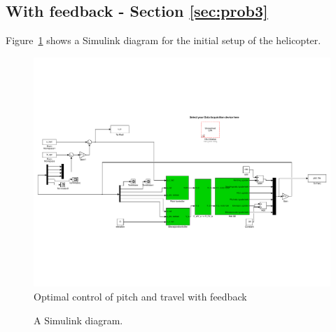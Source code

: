 \documentclass[11pt,a4paper,USenglish]{article} %
\begin{document}
\newpage
\subsection{With feedback - Section \ref{sec:prob3}}\label{sec:simulink:3}
Figure~\ref{fig:with} shows a Simulink diagram for the initial setup of the helicopter.


\begin{figure}[!h]
\centerline{\includegraphics[width=1\textwidth]{helikopter10_3_2}}
\caption{Optimal control of pitch and travel with feedback}
\label{fig:with}
\end{figure}

\begin{figure}[htb]
	\centering
	\caption{A Simulink diagram.}
	\label{fig:simulink}
\end{figure}

\clearpage

\label{sec:bibliography}
\end{document}
